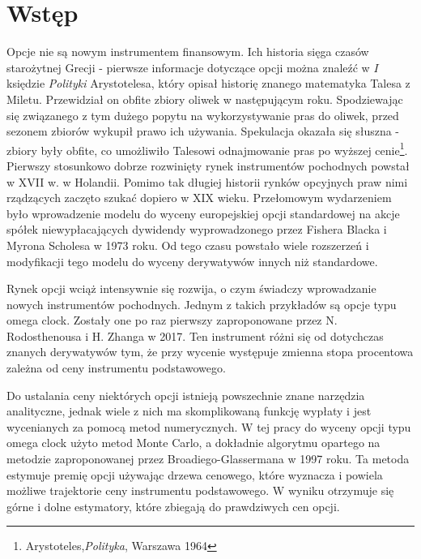 \documentclass[]{pwr_wmat_praca_dyplomowa}
\theoremstyle{plain}
\numberwithin{theorem}{chapter}
\theoremstyle{definition}
\numberwithin{theorem}{chapter}
\begin{document}
\frontmatter
\maketitle
\mainmatter
\tableofcontents
\listoffigures
\listoftables

{\backmatter \chapter{Wstęp}}

Opcje nie są nowym instrumentem finansowym. Ich historia sięga czasów starożytnej Grecji - pierwsze informacje dotyczące opcji można znaleźć w $I$ księdzie \textit{Polityki} Arystotelesa, który opisał historię znanego matematyka Talesa z Miletu. Przewidział on obfite zbiory oliwek w następującym roku. Spodziewając się związanego z tym dużego popytu na wykorzystywanie pras do oliwek, przed sezonem zbiorów wykupił prawo ich używania. Spekulacja okazała się słuszna - zbiory były obfite, co umożliwiło Talesowi odnajmowanie pras po wyższej cenie\footnote{Arystoteles,\textit{Polityka}, Warszawa 1964}. Pierwszy stosunkowo dobrze rozwinięty rynek instrumentów pochodnych powstał w XVII w. w Holandii. Pomimo tak długiej historii rynków opcyjnych praw nimi rządzących zaczęto szukać dopiero w XIX wieku. Przełomowym wydarzeniem było wprowadzenie modelu do wyceny europejskiej opcji standardowej na akcje spółek niewypłacających dywidendy wyprowadzonego przez Fishera Blacka i Myrona Scholesa w 1973 roku. Od tego czasu powstało wiele rozszerzeń i modyfikacji tego modelu do wyceny derywatywów innych niż standardowe.

Rynek opcji wciąż intensywnie się rozwija, o czym świadczy wprowadzanie nowych instrumentów pochodnych. Jednym z takich przykładów są opcje typu omega clock. Zostały one po raz pierwszy zaproponowane przez N. Rodosthenousa i H. Zhanga w 2017. Ten instrument różni się od dotychczas znanych derywatywów tym, że przy wycenie występuje zmienna stopa procentowa zależna od ceny instrumentu podstawowego.

Do ustalania ceny niektórych opcji istnieją powszechnie znane narzędzia analityczne, jednak wiele z nich ma skomplikowaną funkcję wypłaty i jest wycenianych za pomocą metod numerycznych. W tej pracy do wyceny opcji typu omega clock użyto metod Monte Carlo, a dokładnie algorytmu opartego na metodzie zaproponowanej przez Broadiego-Glassermana w 1997 roku. Ta metoda estymuje premię opcji używając drzewa cenowego, które wyznacza i powiela możliwe trajektorie ceny instrumentu podstawowego. W wyniku otrzymuje się górne i dolne estymatory, które zbiegają do prawdziwych cen opcji.
\end{document}
